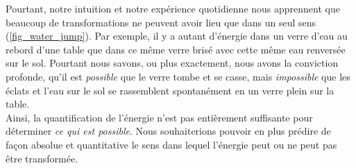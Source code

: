 		Pourtant, notre intuition et notre expérience quotidienne nous apprennent que beaucoup de transformations ne peuvent avoir lieu que dans un seul sens (\cref{fig_water_jump}). Par exemple, il y a autant d’énergie dans un verre d’eau au rebord d’une table que dans ce même verre brisé avec cette même eau renversée sur le sol. Pourtant nous savons, ou plus exactement, nous avons la conviction profonde, qu’il est \emph{possible} que le verre tombe et se casse, mais \emph{impossible} que les éclats et l’eau sur le sol se rassemblent spontanément en un verre plein sur la table.\\
		Ainsi, la quantification de l’énergie n’est pas entièrement suffisante pour déterminer \emph{ce qui est possible}. Nous souhaiterions pouvoir en plus prédire de façon absolue et quantitative le sens dans lequel l’énergie peut ou ne peut pas être transformée.

